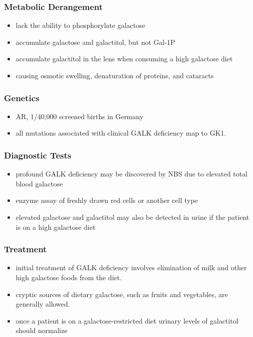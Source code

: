 \documentclass{scrartcl}
\begin{document}
\subsubsection{Metabolic Derangement}
\label{sec:orga85a002}
\begin{itemize}
\item lack the ability to phosphorylate galactose
\item accumulate galactose and galactitol, but not Gal-1P
\item accumulate galactitol in the lens when consuming a high galactose diet
\item causing osmotic swelling, denaturation of proteins, and cataracts
\end{itemize}

\subsubsection{Genetics}
\label{sec:org00b8894}
\begin{itemize}
\item AR, 1/40,000 screened births in Germany
\item all mutations associated with clinical GALK deficiency map to GK1.
\end{itemize}

\subsubsection{Diagnostic Tests}
\label{sec:orge2bf806}
\begin{itemize}
\item profound GALK deficiency may be discovered by NBS due to elevated total blood galactose
\item enzyme assay of freshly drawn red cells or another cell type
\item elevated galactose and galactitol may also be detected in urine if
the patient is on a high galactose diet
\end{itemize}

\subsubsection{Treatment}
\label{sec:org3a084e4}
\begin{itemize}
\item initial treatment of GALK deficiency involves elimination of milk and other high galactose foods from the diet.
\item cryptic sources of dietary galactose, such as fruits and vegetables, are generally allowed.
\item once a patient is on a galactose-restricted diet urinary levels of galactitol should normalize
\end{itemize}
\end{document}
